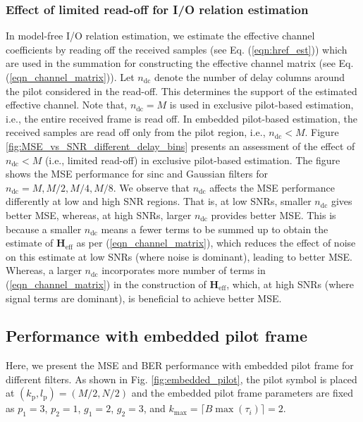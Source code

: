 \subsubsection{Effect of limited read-off for I/O relation estimation}
In model-free I/O relation estimation, we estimate the effective channel coefficients by reading off the received samples (see Eq. (\ref{eqn:href_est})) which are used in the summation for constructing the effective channel matrix (see Eq. (\ref{eqn_channel_matrix})). Let $n_{\mathrm{dc}}$ denote the number of delay columns around the pilot considered in the read-off. This determines the support of the estimated effective channel.  Note that, $n_{\mathrm{dc}}=M$ is used in exclusive pilot-based estimation, i.e., the entire received frame is read off.  
In embedded pilot-based estimation, the received samples are read off only from the pilot region, i.e.,  $n_{\text{dc}}<M$. Figure \ref{fig:MSE_vs_SNR_different_delay_bins} presents an assessment of the effect of  $n_{\mathrm{dc}}<M$ (i.e., limited read-off) in exclusive pilot-based estimation. The figure shows the MSE performance for sinc and Gaussian filters for $n_{\mathrm{dc}}=M, M/2,M/4,M/8$. 
We observe that $n_{\text{dc}}$ affects the MSE performance differently at low and high SNR regions. That is, at low SNRs, 
smaller $n_{\mathrm{dc}}$ gives better MSE, whereas, at high SNRs, 
larger $n_\text{dc}$ provides better MSE. This is because a smaller $n_\text{dc}$ means a fewer terms to be summed up to obtain the estimate of $\textbf{H}_{\mathrm{eff}}$ as per (\ref{eqn_channel_matrix}), 
which reduces the effect of noise on this estimate at low SNRs (where noise is dominant), leading to better MSE. Whereas, a larger $n_\text{dc}$ incorporates more number of terms in (\ref{eqn_channel_matrix}) in the construction of $\textbf{H}_{\mathrm{eff}}$, which, at high SNRs (where signal terms are dominant), is beneficial to achieve better MSE.


\vspace{-2mm}
\subsection{Performance with embedded pilot frame}
Here, we present the MSE and BER performance with embedded pilot frame for different filters. As shown in Fig. \ref{fig:embedded_pilot}, the pilot symbol is placed at $(k_{\text{p}},l_{\text{p}})=(M/2,N/2)$ and the embedded pilot frame parameters are fixed as $p_1=3$, $p_2=1$, $g_1=2$, $g_2=3$,  and $k_{\text{max}}=\lceil B\max(\tau_{i}) \rceil=2$.

